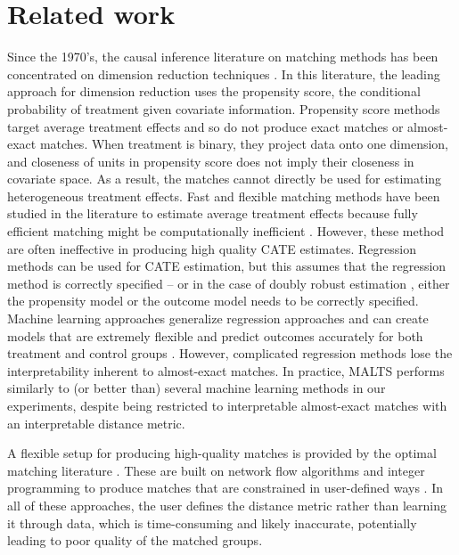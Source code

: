 \section{Related work}

Since the 1970's, the causal inference literature on matching methods has been concentrated on dimension reduction techniques \citep[e.g.,][]{rubin1973matching,rubin1973use,rubin1976multivariate,cochran1973controlling}. In this literature, the leading approach for dimension reduction uses the propensity score, the conditional probability of treatment given covariate information.
Propensity score methods target average treatment effects and so do not produce exact matches or almost-exact matches. When treatment is binary, they project data onto one dimension, and closeness of units in propensity score does not imply their closeness in covariate space. As a result, the matches cannot directly be used for estimating heterogeneous treatment effects. Fast and flexible matching methods have been studied in the literature to estimate average treatment effects because fully efficient matching might be computationally inefficient \citep{gu1993, imbens2004nonparametric}. However, these method are often ineffective in producing high quality CATE estimates. Regression methods can be used for CATE estimation, but this assumes that the regression method is correctly specified -- or in the case of doubly robust estimation \citep[e.g., ][]{farrell2015robust}, either the propensity model or the outcome model needs to be correctly specified. 
Machine learning approaches generalize regression approaches and can create models that are extremely flexible and predict outcomes accurately for both treatment and control groups \citep{hill2011bayesian,chernozhukov2016double,hahn2017bayesian}. However, complicated regression methods lose the interpretability inherent to almost-exact matches.
 In practice, MALTS performs similarly to (or better than) several machine learning methods in our experiments, despite being restricted to interpretable almost-exact matches with an interpretable distance metric.

A flexible setup for producing high-quality matches is provided by the optimal matching literature \citep{rosenbaum2016imposing}. These are built on network flow algorithms and integer programming to produce matches that are constrained in user-defined ways \citep{zubizarreta2012using,zubizarreta2014matching,keele2014optimal,resa2016evaluation,AlamRu15,AlamRu15nonparam,pmlr-v54-kallus17a}. In all of these approaches, the user defines the distance metric rather than learning it through data, which is time-consuming and likely inaccurate, potentially leading to poor quality of the matched groups. 

